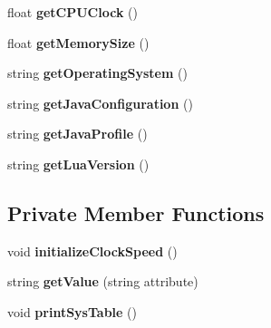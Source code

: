 \begin{CompactItemize}
\item 
float \textbf{getCPUClock} ()\label{classbr_1_1pucrio_1_1telemidia_1_1ginga_1_1core_1_1contextmanager_1_1SystemInfo_9bb5dd5bd8b19eda69ac1170370816d0}

\item 
float \textbf{getMemorySize} ()\label{classbr_1_1pucrio_1_1telemidia_1_1ginga_1_1core_1_1contextmanager_1_1SystemInfo_099308eb9975bdd9082de1571e728bae}

\item 
string \textbf{getOperatingSystem} ()\label{classbr_1_1pucrio_1_1telemidia_1_1ginga_1_1core_1_1contextmanager_1_1SystemInfo_d54b92d20e40c64d0020897132c36b85}

\item 
string \textbf{getJavaConfiguration} ()\label{classbr_1_1pucrio_1_1telemidia_1_1ginga_1_1core_1_1contextmanager_1_1SystemInfo_87d34fc109fd8f6db4d27abec78b9619}

\item 
string \textbf{getJavaProfile} ()\label{classbr_1_1pucrio_1_1telemidia_1_1ginga_1_1core_1_1contextmanager_1_1SystemInfo_a27ac30dc458c90b5437d779de8d3fb2}

\item 
string \textbf{getLuaVersion} ()\label{classbr_1_1pucrio_1_1telemidia_1_1ginga_1_1core_1_1contextmanager_1_1SystemInfo_58a67d4ebad189ff1958e3d1aebbe6fd}

\end{CompactItemize}
\subsection*{Private Member Functions}
\begin{CompactItemize}
\item 
void \textbf{initializeClockSpeed} ()\label{classbr_1_1pucrio_1_1telemidia_1_1ginga_1_1core_1_1contextmanager_1_1SystemInfo_32f16a7174ada009f9bab61879196303}

\item 
string \textbf{getValue} (string attribute)\label{classbr_1_1pucrio_1_1telemidia_1_1ginga_1_1core_1_1contextmanager_1_1SystemInfo_ba4a54f3cbcad4f6225bd94f6146ebe8}

\item 
void \textbf{printSysTable} ()\label{classbr_1_1pucrio_1_1telemidia_1_1ginga_1_1core_1_1contextmanager_1_1SystemInfo_1ba09efda63d97f77d79420f63424cc2}

\end{CompactItemize}
